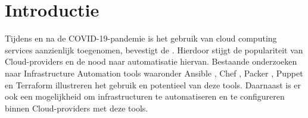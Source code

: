 
\section{Introductie}%
\label{sec:introductie}

\begin{comment}
Waarover zal je bachelorproef gaan? Introduceer het thema en zorg dat volgende zaken zeker duidelijk aanwezig zijn:

\begin{itemize}
  \item kaderen thema
  \item de doelgroep
  \item de probleemstelling en (centrale) onderzoeksvraag
  \item de onderzoeksdoelstelling
\end{itemize}

Denk er aan: een typische bachelorproef is \textit{toegepast onderzoek}, wat betekent dat je start vanuit een concrete probleemsituatie in bedrijfscontext, een \textbf{casus}. Het is belangrijk om je onderwerp goed af te bakenen: je gaat voor die \textit{ene specifieke probleemsituatie} op zoek naar een goede oplossing, op basis van de huidige kennis in het vakgebied.

De doelgroep moet ook concreet en duidelijk zijn, dus geen algemene of vaag gedefinieerde groepen zoals \emph{bedrijven}, \emph{developers}, \emph{Vlamingen}, enz. Je richt je in elk geval op it-professionals, een bachelorproef is geen populariserende tekst. Eén specifiek bedrijf (die te maken hebben met een concrete probleemsituatie) is dus beter dan \emph{bedrijven} in het algemeen.

Formuleer duidelijk de onderzoeksvraag! De begeleiders lezen nog steeds te veel voorstellen waarin we geen onderzoeksvraag terugvinden.

Schrijf ook iets over de doelstelling. Wat zie je als het concrete eindresultaat van je onderzoek, naast de uitgeschreven scriptie? Is het een proof-of-concept, een rapport met aanbevelingen, \ldots Met welk eindresultaat kan je je bachelorproef als een succes beschouwen?

\end{comment}

Tijdens en na de COVID-19-pandemie is het gebruik van cloud computing services aanzienlijk toegenomen, bevestigt de \textcite{EU2021}. Hierdoor stijgt de populariteit van Cloud-providers en de nood naar automatisatie hiervan. Bestaande onderzoeken naar Infrastructure Automation tools waaronder Ansible \autocite{RedHat2022}, Chef \autocite{PSC2022}, Packer \autocite{HashiCorp2022}, Puppet \autocite{Perforce2022} en Terraform \autocite{HashiCorp2022a} illustreren het gebruik en potentieel van deze tools. Daarnaast is er ook een mogelijkheid om infrastructuren te automatiseren en te configureren binnen Cloud-providers met deze tools. 

